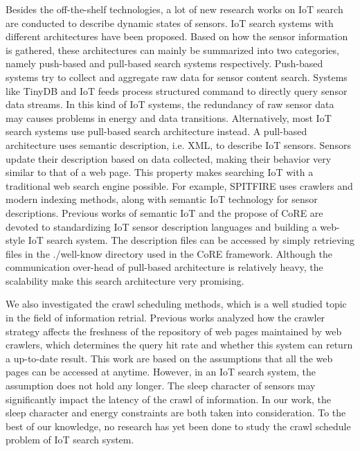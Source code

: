\documentclass[conference]{IEEEtran}
\begin{document}
Besides the off-the-shelf technologies, a lot of new research works on IoT search are conducted to describe dynamic states of sensors. 
IoT search systems with different architectures have been proposed.
Based on how the sensor information is gathered, these architectures can mainly be summarized into two categories, namely push-based and pull-based search systems respectively.
Push-based systems try to collect and aggregate raw data for sensor content search.
Systems like TinyDB\cite{TinyDB} and IoT feeds\cite{Whitehouse2006} process structured command to directly query sensor data streams. 
In this kind of IoT systems, the redundancy of raw sensor data may causes problems in energy and data transitions.
Alternatively, most IoT search systems use pull-based search architecture instead.
A pull-based architecture uses semantic description, i.e. XML, to describe IoT sensors. 
Sensors update their description based on data collected, making their behavior very similar to that of a web page.
This property makes searching IoT with a traditional web search engine possible. 
For example, SPITFIRE\cite{SPITFIRE} uses crawlers and modern indexing methods, along with semantic IoT technology for sensor descriptions. 
Previous works of semantic IoT\cite{Compton2012} and the propose of CoRE\cite{CoREWorkingGroup2012} are devoted to standardizing IoT sensor description languages and building a web-style IoT search system. 
The description files can be accessed by simply retrieving files in the ./well-know directory used in the CoRE framework. 
Although the communication over-head of pull-based architecture is relatively heavy, the scalability make this search architecture very promising.

We also investigated the crawl scheduling methods, which is a well studied topic in the field of information retrial. 
Previous works\cite{Cho2000}\cite{Wolf2002}\cite{Challenger2004} analyzed how the crawler strategy affects the freshness of the repository of web pages maintained by web crawlers, which determines the query hit rate and whether this system can return a up-to-date result. 
This work are based on the assumptions that all the web pages can be accessed at anytime.
However, in an IoT search system, the assumption does not hold any longer.
The sleep character of sensors may significantly impact the latency of the crawl of information.
In our work, the sleep character and energy constraints are both taken into consideration.
To the best of our knowledge, no research has yet been done to study the crawl schedule problem of IoT search system.
\end{document}
